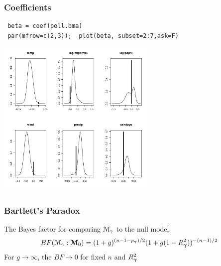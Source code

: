 \documentclass[]{beamer}
\begin{document}
\begin{frame}[fragile]
\frametitle{Coefficients}
\begin{verbatim}
 beta = coef(poll.bma)
 par(mfrow=c(2,3));  plot(beta, subset=2:7,ask=F)
\end{verbatim}
\centering
\includegraphics[height=3in]{poll-beta}  

\end{frame}
\begin{frame}
  \frametitle{Bartlett's Paradox}
 The Bayes factor for comparing ${\cal M}_\gamma$ to the null
model:
$$
 BF({\cal M}_\gamma : \boldsymbol{{\cal M}}_0) =    (1 + g)^{(n - 1 - p_{\boldsymbol{\gamma}})/2} (1 + g(1 - R_{\boldsymbol{\gamma}}^2))^{-(n-1)/2}
$$
\pause 
For $g \to \infty$, the  $BF \to 0$ for fixed $n$ and $R_{\boldsymbol{\gamma}}^2$
\end{frame}
\end{document}
